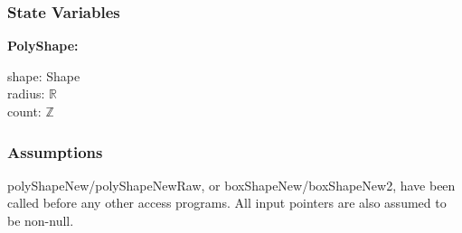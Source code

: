 \documentclass[12pt]{article}
\newcommand{\R}{$\mathbb{R}$}
\newcommand{\Z}{$\mathbb{Z}$}
\begin{document}
\subsubsection{State Variables} \label{SecSVPoly}
	\noindent \textbf{PolyShape:}
	\begin{multicols}{2}
		\noindent shape: Shape \\
		radius: \R \\
		count: \Z \\
	\end{multicols}
	
	\iffalse %
	\noindent Note that \textit{count} is the number of vertices of the PolyShape, and both \textit{planes} and \textit{_planes} store the vertices of the PolyShape. \textit{_planes} are used if the PolyShape has at most \hyperref[SecECShape]{POLY_SHAPE_INLINE_ALLOC} vertices; otherwise, \textit{planes} are used.
	\fi

\subsubsection{Assumptions} \label{SecAPoly}
 polyShapeNew/polyShapeNewRaw, or boxShapeNew/boxShapeNew2, have been called before any other access programs. All input pointers are also assumed to be non-null.
\end{document}
